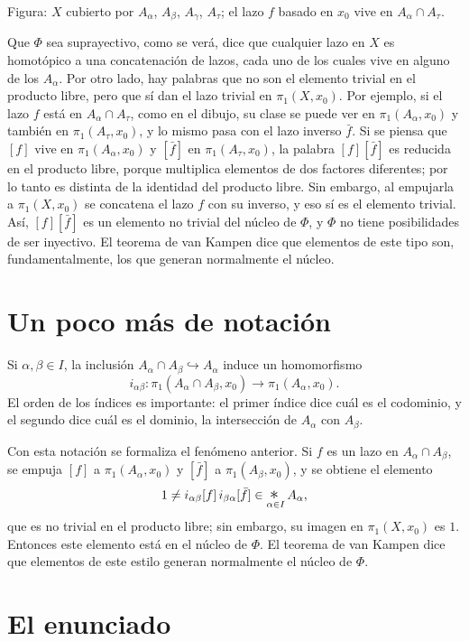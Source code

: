 \documentclass[11pt]{article}
\begin{document}
\noindent Figura: $X$ cubierto por $A_\alpha$, $A_\beta$, $A_\gamma$, $A_\tau$; el lazo $f$ basado en $x_0$ vive en $A_\alpha\cap A_\tau$.

Que $\Phi$ sea suprayectivo, como se verá, dice que cualquier lazo en $X$ es homotópico a una concatenación de lazos, cada uno de los cuales vive en alguno de los $A_\alpha$. Por otro lado, hay palabras que no son el elemento trivial en el producto libre, pero que sí dan el lazo trivial en $\pi_1(X,x_0)$. Por ejemplo, si el lazo $f$ está en $A_\alpha\cap A_\tau$, como en el dibujo, su clase se puede ver en $\pi_1(A_\alpha,x_0)$ y también en $\pi_1(A_\tau,x_0)$, y lo mismo pasa con el lazo inverso $\bar f$. Si se piensa que $[f]$ vive en $\pi_1(A_\alpha,x_0)$ y $[\bar f]$ en $\pi_1(A_\tau,x_0)$, la palabra $[f][\bar f]$ es reducida en el producto libre, porque multiplica elementos de dos factores diferentes; por lo tanto es distinta de la identidad del producto libre. Sin embargo, al empujarla a $\pi_1(X,x_0)$ se concatena el lazo $f$ con su inverso, y eso sí es el elemento trivial. Así, $[f][\bar f]$ es un elemento no trivial del núcleo de $\Phi$, y $\Phi$ no tiene posibilidades de ser inyectivo. El teorema de van Kampen dice que elementos de este tipo son, fundamentalmente, los que generan normalmente el núcleo.

\section*{Un poco más de notación}

Si $\alpha,\beta\in I$, la inclusión $A_\alpha\cap A_\beta\hookrightarrow A_\alpha$ induce un homomorfismo
\[
  i_{\alpha\beta}\colon\pi_1(A_\alpha\cap A_\beta,x_0)\to\pi_1(A_\alpha,x_0).
\]
El orden de los índices es importante: el primer índice dice cuál es el codominio, y el segundo dice cuál es el dominio, la intersección de $A_\alpha$ con $A_\beta$.

Con esta notación se formaliza el fenómeno anterior. Si $f$ es un lazo en $A_\alpha\cap A_\beta$, se empuja $[f]$ a $\pi_1(A_\alpha,x_0)$ y $[\bar f]$ a $\pi_1(A_\beta,x_0)$, y se obtiene el elemento
\[
  1\neq i_{\alpha\beta}[f]\,i_{\beta\alpha}[\bar f]\in \mathop{\scalebox{1.4}{$*$}}_{\alpha\in I} A_\alpha,
\]
que es no trivial en el producto libre; sin embargo, su imagen en $\pi_1(X,x_0)$ es $1$. Entonces este elemento está en el núcleo de $\Phi$. El teorema de van Kampen dice que elementos de este estilo generan normalmente el núcleo de $\Phi$.

\section*{El enunciado}
\end{document}
